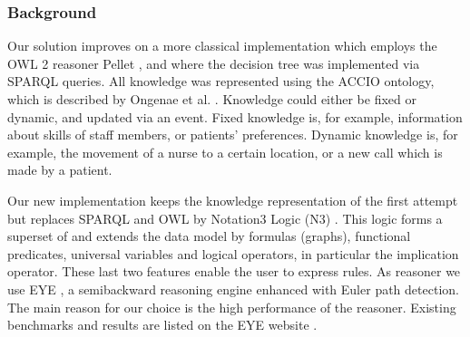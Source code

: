 \subsubsection{Background}
Our solution improves on a more classical implementation which employs the OWL 2 reasoner Pellet \cite{Pellet}, and where
the decision tree was implemented via SPARQL queries.
All knowledge was represented using the ACCIO ontology, which is described %
by Ongenae et al. \cite{accioont}. 
Knowledge could either be fixed or dynamic, and updated via an event.
Fixed knowledge is, for example, information about skills of staff members, or patients' preferences.
Dynamic knowledge is, for example, the movement
of a nurse to a certain location, or a new call which is made by a patient.

Our new implementation keeps the knowledge representation of the first attempt but replaces SPARQL and OWL by Notation3 Logic (N3) \cite{N3Logic}.
This logic forms a superset of \rdf and extends the \rdf data model by formulas (graphs), functional predicates, universal variables and logical operators, in particular
the implication operator. %
These last two features enable the user to express rules. %
As %
reasoner we use EYE \cite{eyepaper}, a semibackward reasoning engine enhanced with Euler path detection. 
The main reason for our choice is the high performance of the reasoner. Existing benchmarks and results are listed on the EYE website \cite{eye}. %
%


